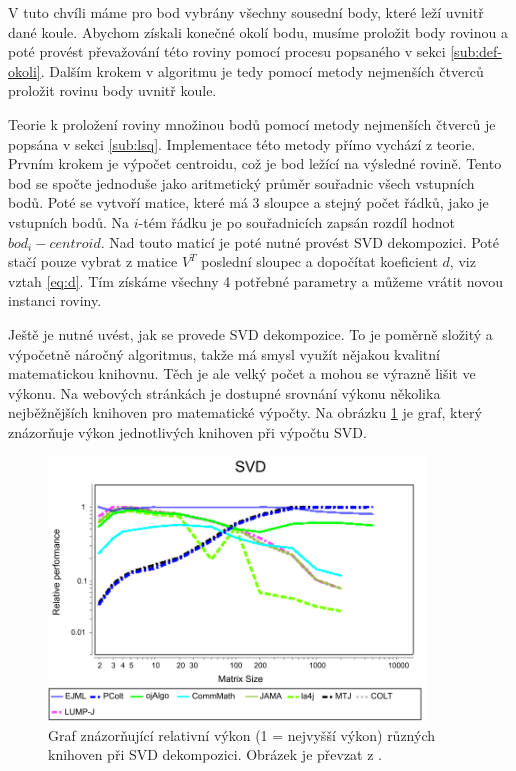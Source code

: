 \documentclass[11pt,twoside,a4paper]{book}
\begin{document}
V tuto chvíli máme pro bod vybrány všechny sousední body, které leží uvnitř dané koule. Abychom získali konečné okolí bodu, musíme proložit body rovinou a poté provést převažování této roviny pomocí procesu popsaného v sekci \ref{sub:def-okoli}. Dalším krokem v algoritmu je tedy pomocí metody nejmenších čtverců proložit rovinu body uvnitř koule.

Teorie k proložení roviny množinou bodů pomocí metody nejmenších čtverců je popsána v sekci \ref{sub:lsq}. Implementace této metody přímo vychází z teorie. Prvním krokem je výpočet centroidu, což je bod ležící na výsledné rovině. Tento bod se spočte jednoduše jako aritmetický průměr souřadnic všech vstupních bodů. Poté se vytvoří matice, které má 3 sloupce a stejný počet řádků, jako je vstupních bodů. Na $i$-tém řádku je po souřadnicích zapsán rozdíl hodnot $bod_i - centroid$. Nad touto maticí je poté nutné provést SVD dekompozici. Poté stačí pouze vybrat z matice $V^T$ poslední sloupec a dopočítat koeficient $d$, viz vztah \ref{eq:d}. Tím získáme všechny 4 potřebné parametry a můžeme vrátit novou instanci roviny.

Ještě je nutné uvést, jak se provede SVD dekompozice. To je poměrně složitý a výpočetně náročný algoritmus, takže má smysl využít nějakou kvalitní matematickou knihovnu. Těch je ale velký počet a mohou se výrazně lišit ve výkonu. Na webových stránkách \cite{svdbench} je dostupné srovnání výkonu několika nejběžnějších knihoven pro matematické výpočty. Na obrázku \ref{fig:svd-bench} je graf, který znázorňuje výkon jednotlivých knihoven při výpočtu SVD.

\begin{figure}[ht]
\begin{center}
\includegraphics[width=10cm]{figures/svd}
\caption{Graf znázorňující relativní výkon (1 = nejvyšší výkon) různých knihoven při SVD dekompozici. Obrázek je převzat z \cite{svdbench}.}
\label{fig:svd-bench}
\end{center}
\end{figure}
\end{document}
